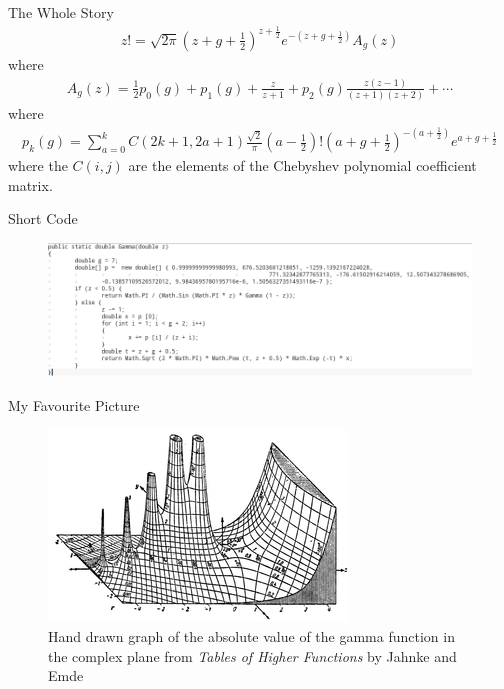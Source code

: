 \documentclass[pdf]{beamer}
\begin{document}
\begin{frame}{The Whole Story}
    \begin{align*}
        z! = \sqrt{2\pi}\left( z + g + \frac{1}{2}\right)^{z + \frac{1}{2}} e^{-(z + g + \frac{1}{2})} A_g(z)
    \end{align*}
    where
    \begin{align*}
        A_g(z) = \frac{1}{2}p_0(g) + p_1(g) + \frac{z}{z+1} + p_2(g) \frac{z(z-1)}{(z+1)(z+2)} + \cdots
    \end{align*}
    where
    \begin{align*}
        p_k(g) = \sum_{a=0}^k C(2k+1, 2a + 1) \frac{\sqrt{2}}{\pi}(a- \frac{1}{2})!(a + g + \frac{1}{2})^{-(a + \frac{1}{2})} e^{a + g + \frac{1}{2}}
    \end{align*}
    where the
    $ C(i,j) $ are the elements of the Chebyshev polynomial coefficient matrix.
\end{frame}
\begin{frame}{Short Code}
\begin{figure}[scale=0.5]
\includegraphics[scale=0.4]{code}
\end{figure}
\end{frame}

\begin{frame}{My Favourite Picture}
\begin{figure}[scale=0.5]
\includegraphics[scale=0.8]{Jahnke_gamma_function}
\caption{Hand drawn graph of the absolute value of the gamma function in the complex plane from \emph{Tables of Higher Functions} by Jahnke and Emde}
\end{figure}
\end{frame}
\end{document}
